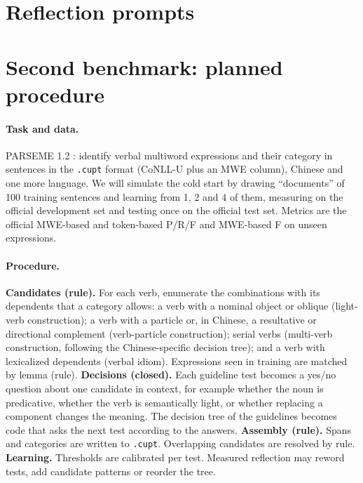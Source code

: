 \section{Reflection prompts}
\label{app:prompts}

\section{Second benchmark: planned procedure}
\label{app:second}
\paragraph{Task and data.} PARSEME 1.2 \citep{ramisch2020parseme}: identify verbal multiword expressions and their category in sentences in the \texttt{.cupt} format (CoNLL-U plus an MWE column), Chinese and one more language. We will simulate the cold start by drawing ``documents'' of 100 training sentences and learning from 1, 2 and 4 of them, measuring on the official development set and testing once on the official test set. Metrics are the official MWE-based and token-based P/R/F and MWE-based F on unseen expressions.

\paragraph{Procedure.}
\textbf{Candidates (rule).} For each verb, enumerate the combinations with its dependents that a category allows: a verb with a nominal object or oblique (light-verb construction); a verb with a particle or, in Chinese, a resultative or directional complement (verb-particle construction); serial verbs (multi-verb construction, following the Chinese-specific decision tree); and a verb with lexicalized dependents (verbal idiom). Expressions seen in training are matched by lemma (rule).
\textbf{Decisions (closed).} Each guideline test becomes a yes/no question about one candidate in context, for example whether the noun is predicative, whether the verb is semantically light, or whether replacing a component changes the meaning. The decision tree of the guidelines becomes code that asks the next test according to the answers.
\textbf{Assembly (rule).} Spans and categories are written to \texttt{.cupt}. Overlapping candidates are resolved by rule.
\textbf{Learning.} Thresholds are calibrated per test. Measured reflection may reword tests, add candidate patterns or reorder the tree.

